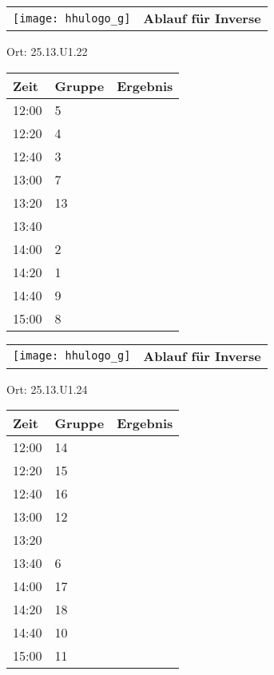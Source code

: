 \documentclass[a4paper,10pt]{article}
\def\spiele{Inverse}
\def\raume{25.13.U1.22}
\def\raumee{25.13.U1.24}
\begin{document}
  \begin{tabularx}{\textwidth}{lc}
    \texttt{[image: hhulogo\_g]}
  & {\Huge \textbf{Ablauf für \spiele}}
  \end{tabularx}
  \LARGE
  \begin{center}
    \vspace{1cm} 
    Ort: \raume

    \vspace{2cm} 
    \begin{tabularx}{0.6\textwidth}{X||X|X}
	\textbf{Zeit} &\textbf{Gruppe} & \textbf{Ergebnis} \\ \hline \hline
	12:00 &	5	&	\\ \hline
	12:20 &	4	&	\\ \hline
	12:40 &	3	&	\\ \hline

	13:00 &	7	&	\\ \hline
	13:20 &	13	&	\\ \hline
	13:40 &		&	\\ \hline

	14:00 &	2	&	\\ \hline
	14:20 &	1	&	\\ \hline
	14:40 &	9	&	\\ \hline

	15:00 &	8	&	\\ \hline
      
    \end{tabularx}
     \end{center}
   \newpage
  \begin{tabularx}{\textwidth}{lc}
    \texttt{[image: hhulogo\_g]}
  & {\Huge \textbf{Ablauf für \spiele}}
  \end{tabularx}
  \LARGE
  \begin{center}
    \vspace{1cm} 
    Ort: \raumee
  
    \vspace{2cm} 
    \begin{tabularx}{0.6\textwidth}{X||X|X}
	\textbf{Zeit} &\textbf{Gruppe} & \textbf{Ergebnis} 	\\ \hline \hline
	12:00 &14	&	\\ \hline
	12:20 &15	&	\\ \hline
	12:40 &16	&	\\ \hline

	13:00 &12	&	\\ \hline
	13:20 &		&	\\ \hline
	13:40 &	6	&	\\ \hline

	14:00 &	17	&	\\ \hline
	14:20 &	18	&	\\ \hline
	14:40 &	10	&	\\ \hline

	15:00 &	11	&	\\ \hline
      
    \end{tabularx}
   \end{center}
   \newpage
\end{document}
